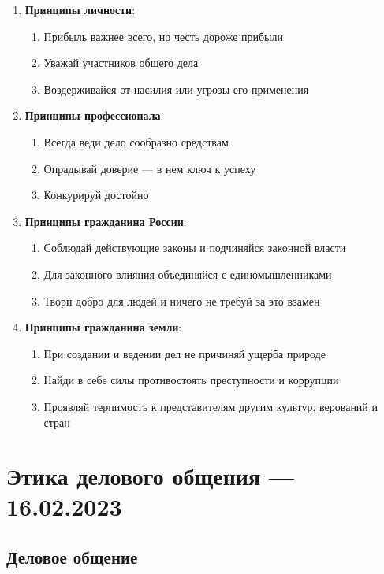 \documentclass[a4paper,14pt]{extarticle}
\begin{document}
\begin{enumerate}
    \item \textbf{Принципы личности}:
    \begin{enumerate}
        \item Прибыль важнее всего, но честь дороже прибыли
        \item Уважай участников общего дела
        \item Воздерживайся от насилия или угрозы его применения
    \end{enumerate}
    \item \textbf{Принципы профессионала}:
    \begin{enumerate}
        \item Всегда веди дело сообразно средствам
        \item Опрадывай доверие — в нем ключ к успеху
        \item Конкурируй достойно
    \end{enumerate}
    \item \textbf{Принципы гражданина России}:
    \begin{enumerate}
        \item Соблюдай действующие законы и подчиняйся законной власти
        \item Для законного влияния объединяйся с единомышленниками
        \item Твори добро для людей и ничего не требуй за это взамен
    \end{enumerate}
    \item \textbf{Принципы гражданина земли}:
    \begin{enumerate}
        \item При создании и ведении дел не причиняй ущерба природе
        \item Найди в себе силы противостоять преступности и коррупции
        \item Проявляй терпимость к представителям другим культур, верований и стран
    \end{enumerate}
\end{enumerate}

\pagebreak
\section{Этика делового общения — 16.02.2023}

\subsection{Деловое общение}
\end{document}
